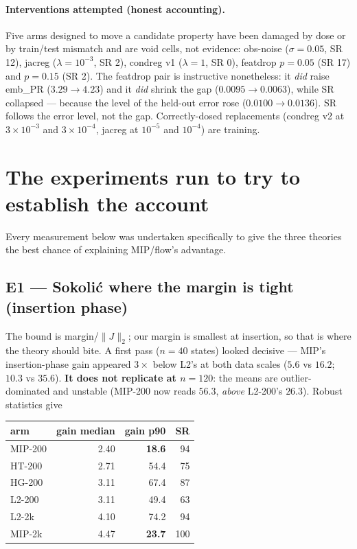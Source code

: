 \documentclass[10pt]{article}
\begin{document}
\paragraph{Interventions attempted (honest accounting).} Five arms
designed to move a candidate property have been damaged by dose or by
train/test mismatch and are void cells, not evidence: obs-noise
($\sigma=0.05$, SR 12), jacreg ($\lambda=10^{-3}$, SR 2), condreg v1
($\lambda=1$, SR 0), featdrop $p=0.05$ (SR 17) and $p=0.15$ (SR 2). The
featdrop pair is instructive nonetheless: it \emph{did} raise emb\_PR
($3.29\to4.23$) and it \emph{did} shrink the gap ($0.0095\to0.0063$),
while SR collapsed --- because the level of the held-out error rose
($0.0100\to0.0136$). SR follows the error level, not the gap.
Correctly-dosed replacements (condreg v2 at $3\times10^{-3}$ and
$3\times10^{-4}$, jacreg at $10^{-5}$ and $10^{-4}$) are training.

\section{The experiments run to try to establish the account}

Every measurement below was undertaken specifically to give the three
theories the best chance of explaining MIP/flow's advantage.

\subsection*{E1 --- Sokoli\'c where the margin is tight (insertion phase)}
The bound is margin/$\|J\|_2$; our margin is smallest at insertion, so that
is where the theory should bite. A first pass ($n=40$ states) looked
decisive --- MIP's insertion-phase gain appeared $3\times$ below L2's at
both data scales ($5.6$ vs $16.2$; $10.3$ vs $35.6$). \textbf{It does not
replicate at $n=120$}: the means are outlier-dominated and unstable
(MIP-200 now reads $56.3$, \emph{above} L2-200's $26.3$). Robust
statistics give

\begin{center}\small
\begin{tabular}{lrrr}
\toprule
arm & gain median & gain p90 & SR \\
\midrule
MIP-200 & 2.40 & \textbf{18.6} & 94 \\
HT-200  & 2.71 & 54.4 & 75 \\
HG-200  & 3.11 & 67.4 & 87 \\
L2-200  & 3.11 & 49.4 & 63 \\
L2-2k   & 4.10 & 74.2 & 94 \\
MIP-2k  & 4.47 & \textbf{23.7} & 100 \\
\bottomrule
\end{tabular}
\end{center}
\end{document}
